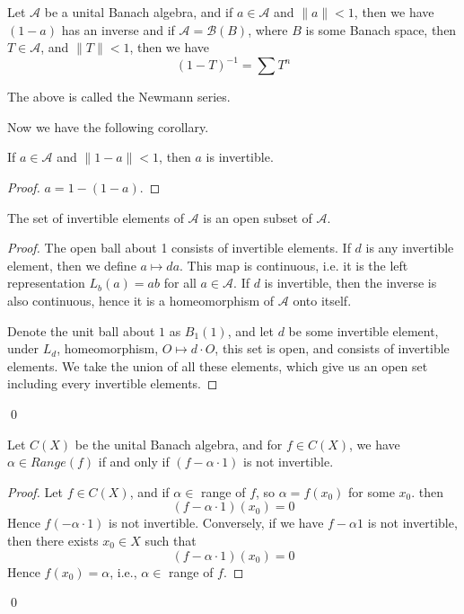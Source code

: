 Let $\mathcal{A}$ be a unital Banach algebra, and if $a\in\mathcal{A}$ and $\|a\|<1$, then we have $(1-a)$ has an inverse and if $\mathcal{A}=\mathcal{B}(B)$, where $B$ is some Banach space, then $T\in\mathcal{A}$, and $\|T\|<1$, then we have
\begin{equation*}
    (1-T)^{-1}=\sum T^n
\end{equation*} 

The above is called the Newmann series.

Now we have the following corollary.
\begin{corollary}
    If $a\in\mathcal{A}$ and $\|1-a\|<1$, then $a$ is invertible.
\end{corollary}
\begin{proof}
    $a=1-(1-a)$.
\end{proof}


\begin{proposition}
    The set of invertible elements of $\mathcal{A}$ is an open subset of $\mathcal{A}$.
\end{proposition}
\begin{proof}
    The open ball about 1 consists of invertible elements. If $d$ is any invertible element, then we define $a\mapsto da$. This map is continuous, i.e. it is the left representation $L_b(a)=ab$ for all $a\in\mathcal{A}$. If $d$ is invertible, then the inverse is also continuous, hence it is a homeomorphism of $\mathcal{A}$ onto itself.

    Denote the unit ball about $1$ as $B_1(1)$, and let $d$ be some invertible element, under $L_d$, homeomorphism, $O\mapsto d\cdot O$, this set is open, and consists of invertible elements. We take the union of all these elements, which give us an open set including every invertible elements.
\end{proof}
\qed

\begin{proposition}
    Let $C(X)$ be the unital Banach algebra, and for $f\in C(X)$, we have $\alpha\in Range(f)$ if and only if $(f-\alpha\cdot 1)$ is not invertible.
\end{proposition}
\begin{proof}
Let $f\in C(X)$, and if $\alpha\in$ range of $f$, so $\alpha=f(x_0)$ for some $x_0$. then
\begin{equation*}
    (f-\alpha\cdot 1)(x_0)=0
\end{equation*}
Hence $f(-\alpha\cdot 1)$ is not invertible.
Conversely, if we have $f-\alpha 1$ is not invertible, then there exists $x_0\in X$ such that
\begin{equation*}
    (f-\alpha\cdot1)(x_0)=0
\end{equation*}
Hence $f(x_0)=\alpha$, i.e., $\alpha\in$ range of $f$.
\end{proof}
\qed


